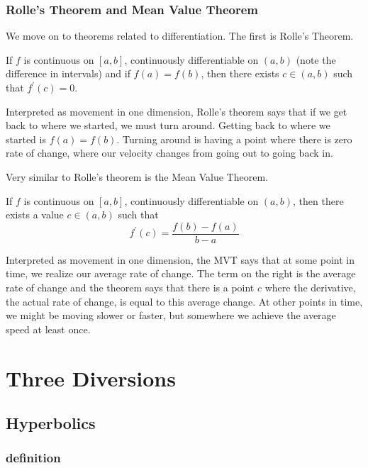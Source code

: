 \documentclass[fleqn]{report}
\begin{document}
\subsection{Rolle's Theorem and Mean Value Theorem}
\label{mvt}

We move on to theorems related to differentiation. The first
is Rolle's Theorem.
\begin{thm} If $f$ is continuous on $[a,b]$,
continuously differentiable on $(a,b)$ (note the difference in
intervals) and if $f(a) = f(b)$, then there exists $c \in (a,b)$
such that $f^\prime(c) = 0$.
\end{thm}
Interpreted as movement in one dimension, Rolle's theorem
says that if we get back to where we started, we must 
turn around. Getting back to where we started is $f(a) =
f(b)$. Turning around is having a point where there is zero
rate of change, where our velocity changes from going out to
going back in.

Very similar to Rolle's theorem is the Mean Value Theorem.
\begin{thm} 
If $f$ is continuous on $[a,b]$, continuously differentiable
on $(a,b)$, then there exists a value $c \in (a,b)$ such that
\begin{equation*}
f^\prime(c) = \frac{f(b) - f(a)}{b-a}
\end{equation*}
\end{thm}
Interpreted as movement in one dimension, the MVT says
that at some point in time, we realize our average rate of
change. The term on the right is the average rate of
change and the theorem says that there is a point $c$ where
the derivative, the actual rate of change, is equal to this
average change. At other points in time, we might be moving 
slower or faster, but somewhere we achieve the average speed at
least once. 

\chapter{Three Diversions}
\label{three-diversions}

\section{Hyperbolics}
\label{hyperbolics}

\subsection{definition}
\label{hyperbolics-definition}
\end{document}
